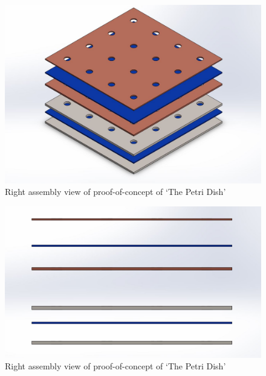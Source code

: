 \documentclass[12pt]{article}
\begin{document}
\begin{figure}[h!]
  \centering
  	\includegraphics[width=\textwidth]{Petri_iso}
  \caption{Right assembly view of proof-of-concept of `The Petri Dish'}
  \label{fig:petri_iso}
\end{figure}

\begin{figure}[h!]
  \centering
  	\includegraphics[width=\textwidth]{Petri_left}
  \caption{Right assembly view of proof-of-concept of `The Petri Dish'}
  \label{fig:petri_left}
\end{figure}
\end{document}
